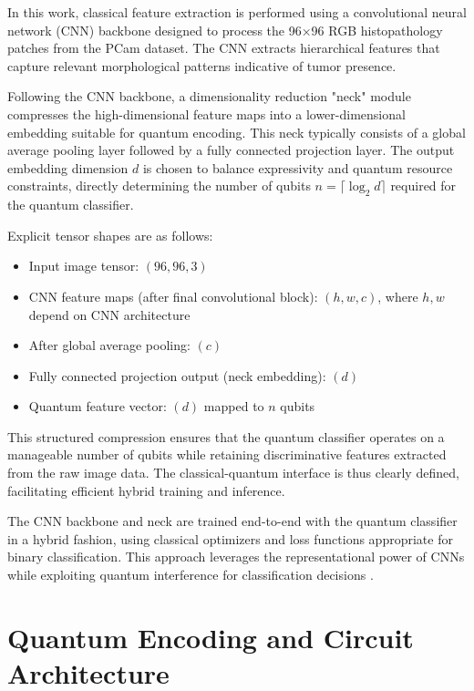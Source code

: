 \documentclass[conference]{IEEEtran}
\begin{document}
In this work, classical feature extraction is performed using a convolutional neural network (CNN) backbone designed to process the 96×96 RGB histopathology patches from the PCam dataset. The CNN extracts hierarchical features that capture relevant morphological patterns indicative of tumor presence.

Following the CNN backbone, a dimensionality reduction "neck" module compresses the high-dimensional feature maps into a lower-dimensional embedding suitable for quantum encoding. This neck typically consists of a global average pooling layer followed by a fully connected projection layer. The output embedding dimension $d$ is chosen to balance expressivity and quantum resource constraints, directly determining the number of qubits $n = \lceil \log_2 d \rceil$ required for the quantum classifier.

Explicit tensor shapes are as follows:

\begin{itemize}
    \item Input image tensor: $(96, 96, 3)$
    \item CNN feature maps (after final convolutional block): $(h, w, c)$, where $h, w$ depend on CNN architecture
    \item After global average pooling: $(c)$
    \item Fully connected projection output (neck embedding): $(d)$
    \item Quantum feature vector: $(d)$ mapped to $n$ qubits
\end{itemize}

This structured compression ensures that the quantum classifier operates on a manageable number of qubits while retaining discriminative features extracted from the raw image data. The classical-quantum interface is thus clearly defined, facilitating efficient hybrid training and inference.

The CNN backbone and neck are trained end-to-end with the quantum classifier in a hybrid fashion, using classical optimizers and loss functions appropriate for binary classification. This approach leverages the representational power of CNNs while exploiting quantum interference for classification decisions \cite{pcam_01,pcam_03}.


\section{Quantum Encoding and Circuit Architecture}
\end{document}
